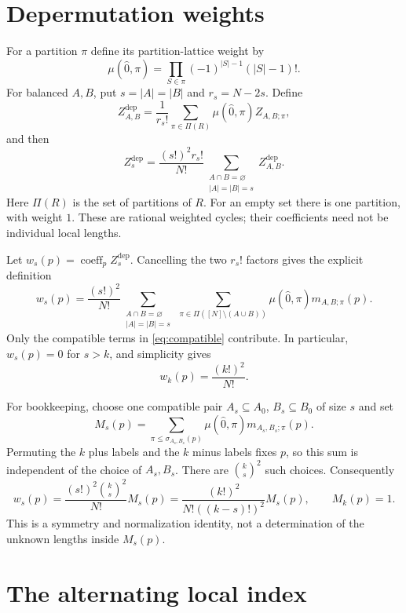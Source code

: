 \documentclass[11pt]{article}
\newcommand{\coeff}{\operatorname{coeff}}
\begin{document}
\section{Depermutation weights}

For a partition $\pi$ define its partition-lattice weight by
\[
 \mu(\hat0,\pi)=\prod_{S\in\pi}(-1)^{|S|-1}(|S|-1)!.
\]
For balanced $A,B$, put $s=|A|=|B|$ and $r_s=N-2s$. Define
\[
 Z^{\mathrm{dep}}_{A,B}
 =\frac1{r_s!}\sum_{\pi\in\Pi(R)}
                  \mu(\hat0,\pi)Z_{A,B;\pi},
\]
and then
\[
 Z_s^{\mathrm{dep}}
 =\frac{(s!)^2r_s!}{N!}
   \sum_{\substack{A\cap B=\varnothing\\|A|=|B|=s}}
     Z^{\mathrm{dep}}_{A,B}.
\]
Here $\Pi(R)$ is the set of partitions of $R$.
For an empty set there is one partition, with weight $1$.
These are rational weighted cycles; their coefficients need not be
individual local lengths.

Let $w_s(p)=\coeff_p Z_s^{\mathrm{dep}}$. Cancelling the two
$r_s!$ factors gives the explicit definition
\begin{equation}\label{eq:weight}
 \boxed{
 w_s(p)=\frac{(s!)^2}{N!}
 \sum_{\substack{A\cap B=\varnothing\\|A|=|B|=s}}
 \ \sum_{\pi\in\Pi([N]\setminus(A\cup B))}
       \mu(\hat0,\pi)m_{A,B;\pi}(p).}
\end{equation}
Only the compatible terms in \eqref{eq:compatible} contribute.
In particular, $w_s(p)=0$ for $s>k$, and simplicity gives
\begin{equation}\label{eq:top}
 w_k(p)=\frac{(k!)^2}{N!}.
\end{equation}

For bookkeeping, choose one compatible pair $A_s\subseteq A_0$,
$B_s\subseteq B_0$ of size $s$ and set
\[
 M_s(p)=\sum_{\pi\leq\sigma_{A_s,B_s}(p)}
          \mu(\hat0,\pi)m_{A_s,B_s;\pi}(p).
\]
Permuting the $k$ plus labels and the $k$ minus labels fixes $p$,
so this sum is independent of the choice of $A_s,B_s$.
There are $\binom ks^2$ such choices. Consequently
\begin{equation}\label{eq:Ms}
 w_s(p)=\frac{(s!)^2\binom ks^2}{N!}M_s(p)
       =\frac{(k!)^2}{N!((k-s)!)^2}M_s(p),
 \qquad M_k(p)=1.
\end{equation}
This is a symmetry and normalization identity, not a determination
of the unknown lengths inside $M_s(p)$.

\section{The alternating local index}
\end{document}
